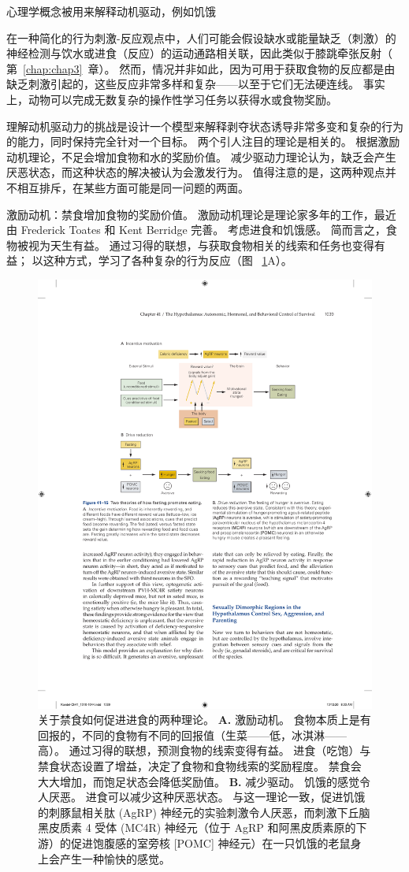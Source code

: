 心理学概念被用来解释动机驱动，例如饥饿

在一种简化的行为刺激-反应观点中，人们可能会假设缺水或能量缺乏（刺激）的神经检测与饮水或进食（反应）的运动通路相关联，因此类似于膝跳牵张反射（ 第~\ref{chap:chap3}~章）。
然而，情况并非如此，因为可用于获取食物的反应都是由缺乏刺激引起的，这些反应非常多样和复杂——以至于它们无法硬连线。
事实上，动物可以完成无数复杂的操作性学习任务以获得水或食物奖励。


理解动机驱动力的挑战是设计一个模型来解释剥夺状态诱导非常多变和复杂的行为的能力，同时保持完全针对一个目标。 两个引人注目的理论是相关的。
根据激励动机理论，不足会增加食物和水的奖励价值。 减少驱动力理论认为，缺乏会产生厌恶状态，而这种状态的解决被认为会激发行为。
值得注意的是，这两种观点并不相互排斥，在某些方面可能是同一问题的两面。


激励动机：禁食增加食物的奖励价值。
激励动机理论是理论家多年的工作，最近由 Frederick Toates 和 Kent Berridge 完善。
考虑进食和饥饿感。
简而言之，食物被视为天生有益。
通过习得的联想，与获取食物相关的线索和任务也变得有益；
以这种方式，学习了各种复杂的行为反应（图 ~\ref{fig:41_15}A）。


\begin{figure}[htbp]
	\centering
	\includegraphics[width=0.75\linewidth]{chap41/fig_41_15}
	\caption{关于禁食如何促进进食的两种理论。 
		\textbf{A.} 激励动机。 食物本质上是有回报的，不同的食物有不同的回报值（生菜——低，冰淇淋——高）。
		通过习得的联想，预测食物的线索变得有益。 进食（吃饱）与禁食状态设置了增益，决定了食物和食物线索的奖励程度。
		禁食会大大增加，而饱足状态会降低奖励值。
		\textbf{B.} 减少驱动。
		饥饿的感觉令人厌恶。
		进食可以减少这种厌恶状态。
		与这一理论一致，促进饥饿的刺豚鼠相关肽 (AgRP) 神经元的实验刺激令人厌恶，而刺激下丘脑黑皮质素 4 受体 (MC4R) 神经元（位于 AgRP 和阿黑皮质素原的下游）的促进饱腹感的室旁核 [POMC] 神经元）在一只饥饿的老鼠身上会产生一种愉快的感觉。}
	\label{fig:41_15}
\end{figure}


